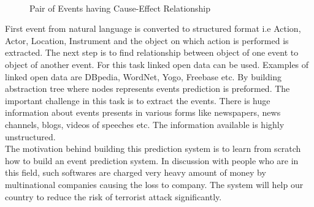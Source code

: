\documentclass[journal,onecolumn,11pt]{IEEEtran}
\begin{document}
\begin{figure}[h!]
    \centering
    \def\svgwidth{0.8\columnwidth}
    
    
    \caption{Pair of Events having Cause-Effect Relationship}
\end{figure}
\newpage
First event from natural language is converted to structured format i.e Action, Actor, Location, Instrument and the object on which action is performed is extracted. The next step is to find relationship between object of one event to object of another event. For this task linked open data can be used. Examples of linked open data are DBpedia, WordNet, Yogo, Freebase etc. By building abstraction tree where nodes represents events prediction is preformed. The important challenge in this task is to extract the events. There is huge information about events presents in various forms like newspapers, news channels, blogs, videos of speeches etc. The information available is highly unstructured.\\
\indent The motivation behind building this prediction system is to learn from scratch how to build an event prediction system. In discussion with people who are in this field, such softwares are charged very heavy amount of money by multinational companies causing the loss to company. The system will help our country to reduce the risk of terrorist attack significantly.
\end{document}
